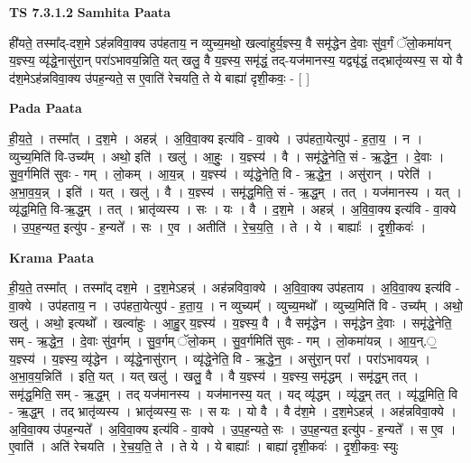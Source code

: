 \documentclass[17pt]{extarticle}
\begin{document}
\textbf{TS 7.3.1.2 } \newline
\textbf{Samhita Paata} \newline

ही॑यते॒ तस्मा᳚द्-दश॒मे ऽह॑न्नविवा॒क्य उप॑हताय॒ न व्युच्य॒मथो॒ खल्वा॑हुर्य॒ज्ञ्स्य॒ वै समृ॑द्धेन दे॒वाः सु॑व॒र्गं ॅलो॒कमा॑यन् य॒ज्ञ्स्य॒ व्यृ॑द्धे॒नासु॑रा॒न् परा॑ऽभावय॒न्निति॒ यत् खलु॒ वै य॒ज्ञ्स्य॒ समृ॑द्धं॒ तद्-यज॑मानस्य॒ यद्व्यृ॑द्धं॒ तद्भ्रातृ॑व्यस्य॒ स यो वै द॑श॒मेऽह॑न्नविवा॒क्य उ॑पह॒न्यते॒ स ए॒वाति॑ रेचयति॒ ते ये बाह्या॑ दृशी॒कवः॒ - [  ] \newline

\textbf{Pada Paata} \newline

ही॒य॒ते॒ । तस्मा᳚त् । द॒श॒मे । अहन्न्॑ । अ॒वि॒वा॒क्य इत्य॑वि - वा॒क्ये । उप॑हता॒येत्युप॑ - ह॒ता॒य॒ । न । व्युच्य॒मिति॑ वि-उच्य᳚म् । अथो॒ इति॑ । खलु॑ । आ॒हुः॒ । य॒ज्ञ्स्य॑ । वै । समृ॑द्धे॒नेति॒ सं - ऋ॒द्धे॒न॒ । दे॒वाः । सु॒व॒र्गमिति॑ सुवः - गम् । लो॒कम् । आ॒य॒न्न् । य॒ज्ञ्स्य॑ । व्यृ॑द्धे॒नेति॒ वि - ऋ॒द्धे॒न॒ । असु॑रान् । परेति॑ । अ॒भा॒व॒य॒न्न् । इति॑ । यत् । खलु॑ । वै । य॒ज्ञ्स्य॑ । समृ॑द्ध॒मिति॒ सं - ऋ॒द्ध॒म् । तत् । यज॑मानस्य । यत् । व्यृ॑द्ध॒मिति॒ वि-ऋ॒द्ध॒म् । तत् । भ्रातृ॑व्यस्य । सः । यः । वै । द॒श॒मे । अहन्न्॑ । अ॒वि॒वा॒क्य इत्य॑वि - वा॒क्ये । उ॒प॒ह॒न्यत॒ इत्यु॑प - ह॒न्यते᳚ । सः । ए॒व । अतीति॑ । रे॒च॒य॒ति॒ । ते । ये । बाह्याः᳚ । दृ॒शी॒कवः॑ ।  \newline


\textbf{Krama Paata} \newline

ही॒य॒ते॒ तस्मा᳚त् । तस्मा᳚द् दश॒मे । द॒श॒मेऽहन्न्॑ । अह॑न्नविवा॒क्ये । अ॒वि॒वा॒क्य उप॑हताय । अ॒वि॒वा॒क्य इत्य॑वि - वा॒क्ये । उप॑हताय॒ न । उप॑हता॒येत्युप॑ - ह॒ता॒य॒ । न व्युच्यम्᳚ । व्युच्य॒मथो᳚ । व्युच्य॒मिति॑ वि - उच्य᳚म् । अथो॒ खलु॑ । अथो॒ इत्यथो᳚ । खल्वा॑हुः । आ॒हु॒र् य॒ज्ञ्स्य॑ । य॒ज्ञ्स्य॒ वै । वै समृ॑द्धेन । समृ॑द्धेन दे॒वाः । समृ॑द्धे॒नेति॒ सम् - ऋ॒द्धे॒न॒ । दे॒वाः सु॑व॒र्गम् । सु॒व॒र्गम् ॅलो॒कम् । सु॒व॒र्गमिति॑ सुवः - गम् । लो॒कमा॑यन्न् । आ॒य॒न्.॒ य॒ज्ञ्स्य॑ । य॒ज्ञ्स्य॒ व्यृ॑द्धेन । व्यृ॑द्धे॒नासु॑रान् । व्यृ॑द्धे॒नेति॒ वि - ऋ॒द्धे॒न॒ । असु॑रा॒न् परा᳚ । परा॑ऽभावयन्न् । अ॒भा॒व॒य॒न्निति॑ । इति॒ यत् । यत् खलु॑ । खलु॒ वै । वै य॒ज्ञ्स्य॑ । य॒ज्ञ्स्य॒ समृ॑द्धम् । समृ॑द्ध॒म् तत् । समृ॑द्ध॒मिति॒ सम् - ऋ॒द्ध॒म् । तद् यज॑मानस्य । यज॑मानस्य॒ यत् । यद् व्यृ॑द्धम् । व्यृ॑द्ध॒म् तत् । व्यृ॑द्ध॒मिति॒ वि - ऋ॒द्ध॒म् । तद् भ्रातृ॑व्यस्य । भ्रातृ॑व्यस्य॒ सः । स यः । यो वै । वै द॑श॒मे । द॒श॒मेऽहन्न्॑ । अह॑न्नविवा॒क्ये । अ॒वि॒वा॒क्य उ॑पह॒न्यते᳚ । अ॒वि॒वा॒क्य इत्य॑वि - वा॒क्ये । उ॒प॒ह॒न्यते॒ सः । उ॒प॒ह॒न्यत॒ इत्यु॑प - ह॒न्यते᳚ । स ए॒व । ए॒वाति॑ । अति॑ रेचयति । रे॒च॒य॒ति॒ ते । ते ये । ये बाह्याः᳚ । बाह्या॑ दृशी॒कवः॑ । दृ॒शी॒कवः॒ स्युः \newline
\end{document}
